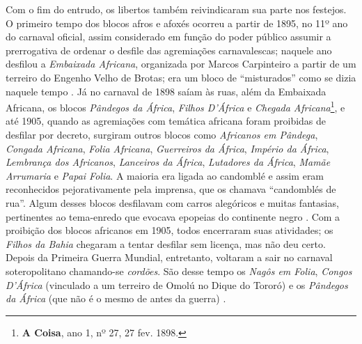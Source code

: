Com o fim do entrudo, os libertos também reivindicaram sua parte nos festejos. O primeiro tempo dos blocos afros e afoxés ocorreu a partir de 1895, no 11º ano do carnaval oficial, assim considerado em função do poder público assumir a prerrogativa de ordenar o desfile das agremiações carnavalescas; naquele ano desfilou a \textit{Embaixada Africana}, organizada por Marcos Carpinteiro a partir de um terreiro do Engenho Velho de Brotas; era um bloco de ``misturados'' como se dizia naquele tempo \cite{cadena_doistemposafro_2017}. Já no carnaval de 1898 saíam às ruas, além da Embaixada Africana, os blocos \textit{Pândegos da África}, \textit{Filhos D'África} e \textit{Chegada Africana}\footnote{\textbf{A Coisa}, ano 1, nº 27, 27 fev. 1898.}, e até 1905, quando as agremiações com temática africana foram proibidas de desfilar por decreto, surgiram outros blocos como \textit{Africanos em Pândega}, \textit{Congada Africana}, \textit{Folia Africana}, \textit{Guerreiros da África}, \textit{Império da África}, \textit{Lembrança dos Africanos}, \textit{Lanceiros da África}, \textit{Lutadores da África}, \textit{Mamãe Arrumaria} e \textit{Papai Folia}.  A maioria era ligada ao candomblé e assim eram reconhecidos pejorativamente pela imprensa, que os chamava ``candomblés de rua''. Algum desses blocos desfilavam com carros alegóricos e muitas fantasias, pertinentes ao tema-enredo que evocava epopeias do continente negro \cite{cadena_doistemposafro_2017}. Com a proibição dos blocos africanos em 1905, todos encerraram suas atividades; os \textit{Filhos da Bahia} chegaram a tentar desfilar sem licença, mas não deu certo. Depois da Primeira Guerra Mundial, entretanto, voltaram a sair no carnaval soteropolitano chamando-se \textit{cordões}. São desse tempo os \textit{Nagôs em Folia}, \textit{Congos D’África} (vinculado a um terreiro de Omolú no Dique do Tororó) e os \textit{Pândegos da África} (que não é o mesmo de antes da guerra) \cite{cadena_doistemposafro_2017}.